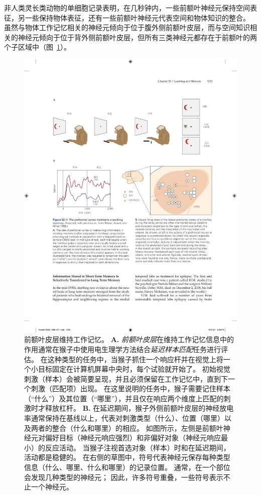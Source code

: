 非人类灵长类动物的单细胞记录表明，在几秒钟内，一些前额叶神经元保持空间表征，另一些保持物体表征，还有一些前额叶神经元代表空间和物体知识的整合。
虽然与物体工作记忆相关的神经元倾向于位于腹外侧前额叶皮层，而与空间知识相关的神经元倾向于位于背外侧前额叶皮层，但所有三类神经元都存在于前额叶的两个子区域中（图~\ref{fig:52_1}）。


\begin{figure}[htbp]
	\centering
	\includegraphics[width=0.95\linewidth]{chap52/fig_52_1}
	\caption{前额叶皮层维持工作记忆\cite{rainer1998memory}。
		\textbf{A.} \textit{前额叶皮层}在维持工作记忆信息中的作用通常在猴子中使用电生理学方法结合\textit{延迟样本匹配}任务进行评估。
		在这种类型的任务中，当猴子抓住一个响应杆并在视觉上将一个小目标固定在计算机屏幕中央时，每个试验就开始了。
		初始视觉刺激（样本）会被简要呈现，并且必须保留在工作记忆中，直到下一个刺激（匹配项）出现。
		在这里说明的任务中，猴子需要记住样本（“什么”）及其位置（“哪里”），并且仅在响应两个维度上匹配的刺激时才释放杠杆。
		\textbf{B.} 在延迟期间，猴子外侧前额叶皮层的神经放电率通常保持在基线以上，代表对刺激类型（什么）、位置（哪里）以及两者的整合（什么和哪里）的相应。
		如图所示，左侧是前额叶神经元对偏好目标（神经元响应强烈）和非偏好对象（神经元响应最小）的反应活动。
		当猴子注视首选对象（样本）时和在延迟期间，活动都是稳健的。
		在右侧的草图中，符号代表神经元保存每种类型信息（什么、哪里、什么和哪里）的记录位置。
		通常，在一个部位会发现几种类型的神经元；
		因此，许多符号重叠，一些符号表示不止一个神经元。}
	\label{fig:52_1}
\end{figure}


